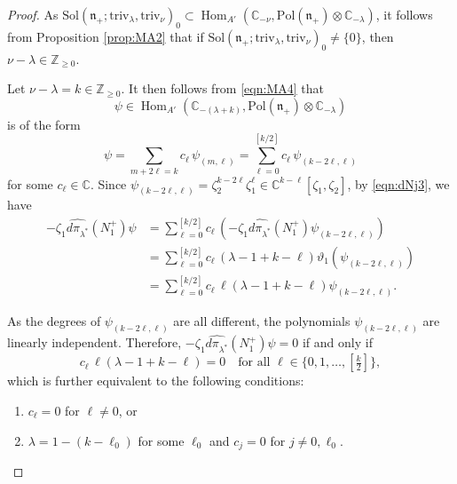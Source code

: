 \documentclass[reqno,11pt]{amsart}
\theoremstyle{remark}
\theoremstyle{definition}
\numberwithin{equation}{section}
\newcommand{\fn}{{\mathfrak n}}
\newcommand{\C}{\mathbb{C}}
\newcommand{\Z}{\mathbb{Z}}
\newcommand{\Hom}{\operatorname{Hom}}
\newcommand{\Sol}{\mathrm{Sol}}
\newcommand{\Pol}{\mathrm{Pol}}
\newcommand{\triv}{\mathrm{triv}}
\newcommand{\dpi}{d\pi}
\begin{document}
\begin{proof}
As
$\Sol(\fn_+; \triv_{\lambda}, \triv_{\nu})_0\subset
\Hom_{A'}(\C_{-\nu}, \Pol(\fn_+)\otimes \C_{-\lambda})$,
it follows from Proposition \ref{prop:MA2} that if 
$\Sol(\fn_+; \triv_{\lambda}, \triv_{\nu})_0\neq \{0\}$, then
$\nu- \lambda \in \Z_{\geq 0}$. 

Let $\nu- \lambda =k \in \Z_{\geq 0}$. 
It then follows from \eqref{eqn:MA4} that 
\begin{equation*}
\psi \in \Hom_{A'}(\C_{-(\lambda+k)}, \Pol(\fn_+)\otimes \C_{-\lambda})
\end{equation*}
is of the form
\begin{equation*}
\psi = 
\sum_{m+2\ell = k}
c_\ell\, \psi_{(m, \ell)}
=
\sum_{\ell=0}^{[k/2]}
c_\ell\, \psi_{(k-2\ell, \ell)}
\end{equation*}
for some $c_\ell \in \C$.
Since $\psi_{(k-2\ell, \ell)}=\zeta_2^{k-2\ell}\zeta_1^\ell \in \C^{k-\ell}[\zeta_1,\zeta_2]$,
by \eqref{eqn:dNj3}, we have 
\begin{align*}
-\zeta_1\widehat{\dpi_{\lambda^*}}(N_1^+)\psi
&=
\sum_{\ell =0}^{[k/2]}c_\ell \,
(-\zeta_1\widehat{\dpi_{\lambda^*}}(N_1^+)\psi_{(k-2\ell, \ell)})\\
&=
\sum_{\ell =0}^{[k/2]}c_\ell \,
(\lambda-1+k-\ell)\vartheta_1(\psi_{(k-2\ell, \ell)})\\
&=
\sum_{\ell =0}^{[k/2]}
 c_\ell \, \ell (\lambda-1+k-\ell)\psi_{(k-2\ell, \ell)}.
\end{align*}

As the degrees of $\psi_{(k-2\ell,\ell)}$ are all different, the polynomials
$\psi_{(k-2\ell, \ell)}$ are linearly independent.
Therefore,
$-\zeta_1\widehat{\dpi_{\lambda^*}}(N_1^+)\psi=0$
if and only if 
\begin{equation*}
c_\ell \, \ell(\lambda-1+k-\ell)=0
\quad 
\text{for all $\ell \in \{0,1,\ldots, [\tfrac{k}{2}]\}$},
\end{equation*}
which 
is further equivalent to the following conditions:
\begin{enumerate}
\item[(I)] 
$c_\ell =0$ for $\ell \neq 0$, or
\item[(II)]
$\lambda = 1-(k-\ell_0)$ for some $\ell_0$ and $c_j=0$ for $j \neq 0, \ell_0$.
\end{enumerate}


\end{proof}
\end{document}
